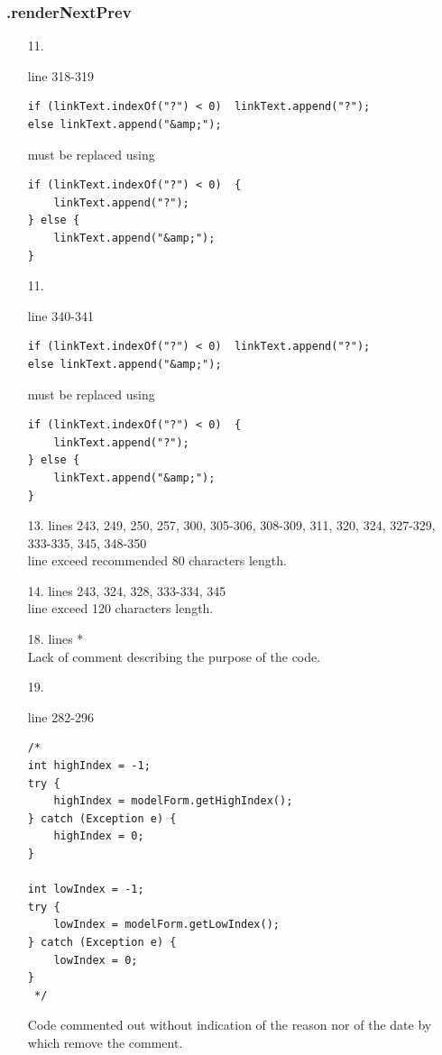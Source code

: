 \documentclass[english]{article}
\begin{document}
\subsubsection*{.renderNextPrev}
	\begin{itemize}
	
	\item[11.]{ line 318-319
		\begin{lstlisting}
if (linkText.indexOf("?") < 0)  linkText.append("?");
else linkText.append("&amp;");
		\end{lstlisting} must be replaced using
		\begin{lstlisting}
if (linkText.indexOf("?") < 0)  {
    linkText.append("?");
} else {
    linkText.append("&amp;");
}
		\end{lstlisting}}
		
		\item[11.]{ line 340-341
		\begin{lstlisting}
if (linkText.indexOf("?") < 0)  linkText.append("?");
else linkText.append("&amp;");
		\end{lstlisting} must be replaced using
		\begin{lstlisting}
if (linkText.indexOf("?") < 0)  {
    linkText.append("?");
} else {
    linkText.append("&amp;");
}
		\end{lstlisting}}
	
	\item[13.]{lines 243, 249, 250, 257, 300, 305-306, 308-309, 311, 320, 324, 327-329, 333-335, 345, 348-350 \\
		line exceed recommended 80 characters length.}

\item[14.]{lines  243, 324, 328, 333-334, 345\\
		line exceed 120 characters length.}
		
		\item[18.]{lines  *\\
		Lack of comment describing the purpose of the code.}
		
\item[19.]{ line 282-296
		\begin{lstlisting}
/*
int highIndex = -1;
try {
    highIndex = modelForm.getHighIndex();
} catch (Exception e) {
    highIndex = 0;
}

int lowIndex = -1;
try {
    lowIndex = modelForm.getLowIndex();
} catch (Exception e) {
    lowIndex = 0;
}
 */
		\end{lstlisting}
		Code commented out without indication of the reason nor of the date by which remove the comment.}
		

\end{itemize}
\end{document}
